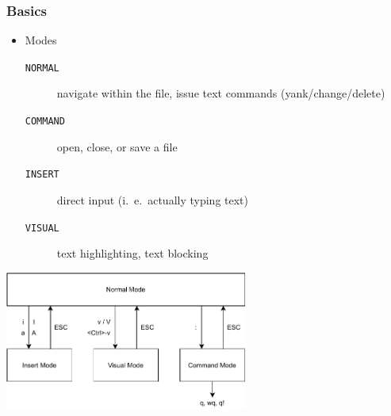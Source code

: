 \documentclass{beamer}
\begin{document}
\begin{frame}
    \frametitle{Basics}
    \begin{itemize}
        \item Modes
            \begin{description}
                \item [\texttt{NORMAL}]  navigate within the file, issue text commands (yank/change/delete)
                \item [\texttt{COMMAND}] open, close, or save a file
                \item [\texttt{INSERT}]  direct input (i.\ e.\ actually typing text)
                \item [\texttt{VISUAL}]  text highlighting, text blocking
            \end{description}
    \end{itemize}
    \vspace{0.5cm}
    \begin{center}
        \includegraphics[width=0.6\textwidth]{graphics/vim_modes.pdf}
    \end{center}
\end{frame}
\end{document}
